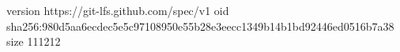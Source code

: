version https://git-lfs.github.com/spec/v1
oid sha256:980d5aa6ecdec5e5c97108950e55b28e3eecc1349b14b1bd92446ed0516b7a38
size 111212
